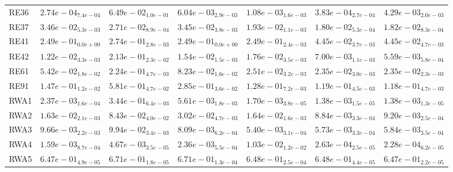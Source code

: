 \documentclass{article}
\begin{document}
\begin{table}
\begin{scriptsize}
\begin{tabular}{lllllll}
RE36 & \cellcolor{gray95}$  2.74e-04_{ 7.4e-04}$ & $  6.49e-02_{ 1.0e-01}$ & $  6.04e-03_{ 2.9e-03}$ & $  1.08e-03_{ 1.6e-03}$ & \cellcolor{gray25}$  3.83e-04_{ 2.7e-04}$ & $  4.29e-03_{ 2.0e-03}$ \\
RE37 & $  3.46e-02_{ 5.3e-03}$ & $  2.71e-02_{ 8.9e-04}$ & $  3.45e-02_{ 3.8e-03}$ & $  1.93e-02_{ 1.1e-03}$ & \cellcolor{gray95}$  1.80e-02_{ 5.3e-04}$ & \cellcolor{gray25}$  1.82e-02_{ 8.3e-04}$ \\
RE41 & $  2.49e-01_{ 0.0e+00}$ & $  2.74e-01_{ 2.8e-03}$ & $  2.49e-01_{ 0.0e+00}$ & $  2.49e-01_{ 2.4e-03}$ & \cellcolor{gray95}$  4.45e-02_{ 3.7e-03}$ & \cellcolor{gray25}$  4.45e-02_{ 4.7e-03}$ \\
RE42 & $  1.22e-02_{ 3.3e-03}$ & $  2.13e-01_{ 2.3e-02}$ & $  1.54e-02_{ 1.5e-03}$ & $  1.76e-02_{ 3.5e-03}$ & \cellcolor{gray25}$  7.00e-03_{ 1.1e-03}$ & \cellcolor{gray95}$  5.59e-03_{ 5.8e-04}$ \\
RE61 & $  5.42e-02_{ 1.8e-02}$ & $  2.24e-01_{ 4.7e-03}$ & $  8.23e-02_{ 1.6e-02}$ & $  2.51e-02_{ 3.2e-03}$ & \cellcolor{gray95}$  2.35e-02_{ 3.0e-03}$ & \cellcolor{gray25}$  2.35e-02_{ 2.3e-03}$ \\
RE91 & $  1.47e-01_{ 1.2e-02}$ & $  5.81e-01_{ 4.7e-02}$ & $  2.85e-01_{ 3.6e-02}$ & $  1.28e-01_{ 7.2e-03}$ & \cellcolor{gray25}$  1.19e-01_{ 4.5e-03}$ & \cellcolor{gray95}$  1.18e-01_{ 4.7e-03}$ \\
RWA1 & $  2.37e-03_{ 1.6e-04}$ & $  3.44e-01_{ 6.4e-03}$ & $  5.61e-03_{ 1.8e-03}$ & $  1.70e-03_{ 3.8e-05}$ & \cellcolor{gray95}$  1.38e-03_{ 1.5e-05}$ & \cellcolor{gray25}$  1.38e-03_{ 1.3e-05}$ \\
RWA2 & $  1.63e-02_{ 2.1e-03}$ & $  8.43e-02_{ 4.0e-02}$ & $  3.02e-02_{ 4.7e-03}$ & $  1.64e-02_{ 1.6e-03}$ & \cellcolor{gray95}$  8.84e-03_{ 3.3e-04}$ & \cellcolor{gray25}$  9.20e-03_{ 2.5e-04}$ \\
RWA3 & $  9.66e-03_{ 2.2e-03}$ & $  9.94e-02_{ 3.4e-03}$ & $  8.09e-03_{ 6.2e-04}$ & \cellcolor{gray95}$  5.40e-03_{ 3.1e-04}$ & \cellcolor{gray25}$  5.73e-03_{ 3.3e-04}$ & $  5.84e-03_{ 3.5e-04}$ \\
RWA4 & $  1.59e-03_{ 8.7e-04}$ & $  4.67e-03_{ 3.5e-05}$ & $  2.36e-03_{ 5.5e-04}$ & $  1.03e-02_{ 1.2e-02}$ & \cellcolor{gray25}$  2.63e-04_{ 2.5e-05}$ & \cellcolor{gray95}$  2.28e-04_{ 6.2e-05}$ \\
RWA5 & \cellcolor{gray25}$  6.47e-01_{ 4.9e-05}$ & $  6.71e-01_{ 1.8e-05}$ & $  6.71e-01_{ 1.3e-04}$ & $  6.48e-01_{ 2.5e-04}$ & $  6.48e-01_{ 4.4e-05}$ & \cellcolor{gray95}$  6.47e-01_{ 2.2e-05}$ \\

\end{tabular}
\end{scriptsize}
\end{table}
\end{document}
